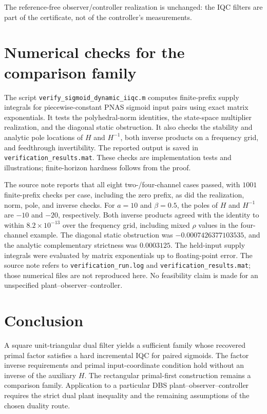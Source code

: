 \documentclass[final,5p,twocolumn]{elsarticle}
\theoremstyle{definition}
\theoremstyle{remark}
\begin{document}
The reference-free observer/controller realization is unchanged: the IQC filters are part of the certificate, not of the controller's measurements.

\section{Numerical checks for the comparison family}\label{sec:checks}
The script \texttt{verify\_sigmoid\_dynamic\_iiqc.m} computes finite-prefix supply integrals for piecewise-constant PNAS sigmoid input pairs using exact matrix exponentials. It tests the polyhedral-norm identities, the state-space multiplier realization, and the diagonal static obstruction. It also checks the stability and analytic pole locations of $H$ and $H^{-1}$, both inverse products on a frequency grid, and feedthrough invertibility. The reported output is saved in \texttt{verification\_results.mat}. These checks are implementation tests and illustrations; finite-horizon hardness follows from the proof.

The source note reports that all eight two-/four-channel cases passed, with $1001$ finite-prefix checks per case, including the zero prefix, as did the realization, norm, pole, and inverse checks. For $a=10$ and $\beta=0.5$, the poles of $H$ and $H^{-1}$ are $-10$ and $-20$, respectively. Both inverse products agreed with the identity to within $8.2\times10^{-13}$ over the frequency grid, including mixed $\rho$ values in the four-channel example. The diagonal static obstruction was $-0.0007426377103535$, and the analytic complementary strictness was $0.0003125$. The held-input supply integrals were evaluated by matrix exponentials up to floating-point error. The source note refers to \texttt{verification\_run.log} and \texttt{verification\_results.mat}; those numerical files are not reproduced here. No feasibility claim is made for an unspecified plant--observer--controller.

\section{Conclusion}
A square unit-triangular dual filter yields a sufficient family whose recovered primal factor satisfies a hard incremental IQC for paired sigmoids. The factor inverse requirements and primal input-coordinate condition hold without an inverse of the auxiliary $H$. The rectangular primal-first construction remains a comparison family. Application to a particular DBS plant--observer--controller requires the strict dual plant inequality and the remaining assumptions of the chosen duality route.
\end{document}
